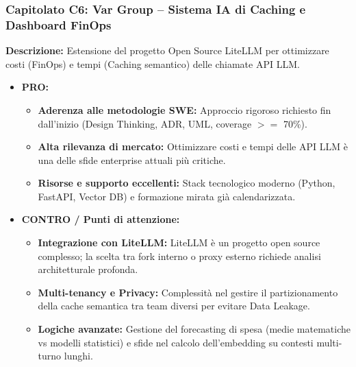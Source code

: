 \documentclass[a4paper, 11pt]{article}
\begin{document}
\subsubsection*{Capitolato C6: Var Group -- Sistema IA di Caching e Dashboard FinOps}
\textbf{Descrizione:} Estensione del progetto Open Source LiteLLM per ottimizzare costi (FinOps) e tempi (Caching semantico) delle chiamate API LLM.
\begin{itemize}
    \item \textbf{PRO:}
    \begin{itemize}
        \item \textbf{Aderenza alle metodologie SWE:} Approccio rigoroso richiesto fin dall'inizio (Design Thinking, ADR, UML, coverage $>=$ 70\%).
        \item \textbf{Alta rilevanza di mercato:} Ottimizzare costi e tempi delle API LLM è una delle sfide enterprise attuali più critiche.
        \item \textbf{Risorse e supporto eccellenti:} Stack tecnologico moderno (Python, FastAPI, Vector DB) e formazione mirata già calendarizzata.
    \end{itemize}
    \item \textbf{CONTRO / Punti di attenzione:}
    \begin{itemize}
        \item \textbf{Integrazione con LiteLLM:} LiteLLM è un progetto open source complesso; la scelta tra fork interno o proxy esterno richiede analisi architetturale profonda.
        \item \textbf{Multi-tenancy e Privacy:} Complessità nel gestire il partizionamento della cache semantica tra team diversi per evitare Data Leakage.
        \item \textbf{Logiche avanzate:} Gestione del forecasting di spesa (medie matematiche vs modelli statistici) e sfide nel calcolo dell'embedding su contesti multi-turno lunghi.
    \end{itemize}
\end{itemize}
\end{document}
